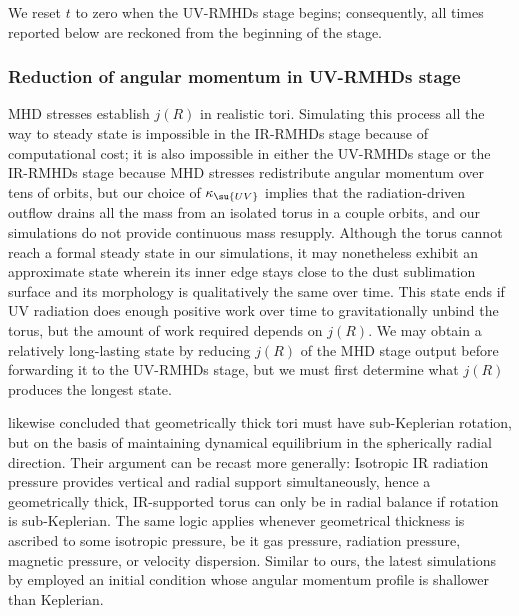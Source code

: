\documentclass[twocolumn]{article}
\newcommand*\uvrmhd{\ac{UV}\protect\nobreakdash-\acp{RMHD}}
\newcommand*\irrmhd{\ac{IR}\protect\nobreakdash-\acp{RMHD}}
\newcommand*\titleuvrmhd{\texorpdfstring
  {\acs*{UV}\protect\nobreakdash-\acsp*{RMHD}}{UV-RMHD}}
\begin{document}
We reset $t$ to zero when the \uvrmhd{} stage begins; consequently, all times
reported below are reckoned from the beginning of the stage.

\subsubsection{Reduction of angular momentum in \titleuvrmhd{} stage}
\label{sec:angular momentum}

\Ac{MHD} stresses establish $j(R)$ in realistic tori. Simulating this process
all the way to steady state is impossible in the \irrmhd{} stage because of
computational cost; it is also impossible in either the \uvrmhd{} stage or the
\irrmhd{} stage because \ac{MHD} stresses redistribute angular momentum over
tens of orbits, but our choice of $\kappa_\su{UV}$ implies that the
radiation-driven outflow drains all the mass from an isolated torus in a couple
orbits, and our simulations do not provide continuous mass resupply. Although
the torus cannot reach a formal steady state in our simulations, it may
nonetheless exhibit an approximate  state wherein its inner
edge stays close to the dust sublimation surface and its morphology is
qualitatively the same over time. This  state ends if \ac{UV}
radiation does enough positive work over time to gravitationally unbind the
torus, but the amount of work required depends on $j(R)$. We may obtain a
relatively long-lasting  state by reducing $j(R)$ of the
\ac{MHD} stage output before forwarding it to the \uvrmhd{} stage, but we must
first determine what $j(R)$ produces the longest  state.

 likewise concluded that geometrically thick tori
must have sub-Keplerian rotation, but on the basis of maintaining dynamical
equilibrium in the spherically radial direction. Their argument can be recast
more generally: Isotropic \ac{IR} radiation pressure provides vertical and
radial support simultaneously, hence a geometrically thick, \ac{IR}-supported
torus can only be in radial balance if rotation is sub-Keplerian. The same
logic applies whenever geometrical thickness is ascribed to some isotropic
pressure, be it gas pressure, radiation pressure, magnetic pressure, or
velocity dispersion. Similar to ours, the latest simulations by
\citet{2016ApJ...819..115D} employed an initial condition whose angular
momentum profile is shallower than Keplerian.
\end{document}
